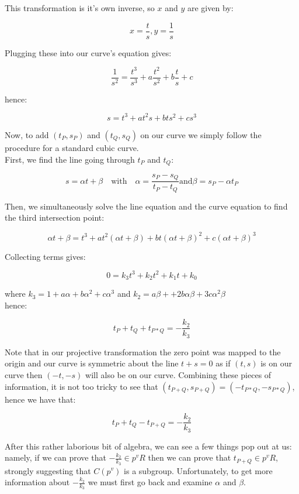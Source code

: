 \documentclass{article}
\begin{document}
This transformation is it's own inverse, so $x$ and $y$ are given by:

\[ x = \frac{t}{s}, y = \frac{1}{s} \]

Plugging these into our curve's equation gives:

\[ \frac{1}{s^2} = \frac{t^3}{s^3} + a \frac{t^2}{s^2} + b \frac{t}{s} + c \]

hence:

\[ s = t^3 + a t^2 s + b t s^2 + c s^3 \]

Now, to add $(t_P, s_P)$ and $(t_Q, s_Q)$ on our curve we simply follow the procedure for a standard cubic curve.\\

First, we find the line going through $t_P$ and $t_Q$:

\[ s = \alpha t + \beta \quad \text{with} \quad \alpha = \frac{s_P - s_Q}{t_P - t_Q} \text{and} \beta = s_P - \alpha t_P \]

Then, we simultaneously solve the line equation and the curve equation to find the third intersection point:

\[ \alpha t + \beta = t^3 + a t^2 (\alpha t + \beta) + b t (\alpha t + \beta)^2 + c (\alpha t + \beta)^3 \]

Collecting terms gives:

\[ 0 = k_3 t^3 + k_2 t^2 + k_1 t + k_0 \]

where $k_3 = 1 + a \alpha + b \alpha^2 + c \alpha^3$ and $k_2 = a \beta + + 2 b \alpha \beta + 3c \alpha^2 \beta$\\

hence: 

\[ t_P + t_Q + t_{P*Q} = -\frac{k_2}{k_3} \]

Note that in our projective transformation the zero point was mapped to the origin and our curve is symmetric about the line $t + s = 0$ as if $(t, s)$ is on our curve then $(-t, -s)$ will also be on our curve. Combining these pieces of information, it is not too tricky to see that $(t_{P + Q}, s_{P + Q}) = (-t_{P * Q}, -s_{P * Q})$, hence we have that:

\[ t_P + t_Q - t_{P+Q} = -\frac{k_2}{k_3} \]

After this rather laborious bit of algebra, we can see a few things pop out at us: namely, if we can prove that $-\frac{k_2}{k_3} \in p^v R$ then we can prove that $t_{P+Q} \in p^v R$, strongly suggesting that $C(p^v)$ is a subgroup. Unfortunately, to get more information about $-\frac{k_2}{k_3}$ we must first go back and examine $\alpha$ and $\beta$. \\
\end{document}
